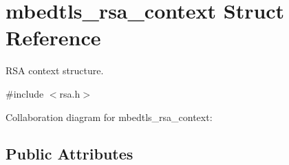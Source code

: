 \hypertarget{structmbedtls__rsa__context}{}\section{mbedtls\+\_\+rsa\+\_\+context Struct Reference}
\label{structmbedtls__rsa__context}


R\+SA context structure.  




{\ttfamily \#include $<$rsa.\+h$>$}



Collaboration diagram for mbedtls\+\_\+rsa\+\_\+context\+:
\subsection*{Public Attributes}
